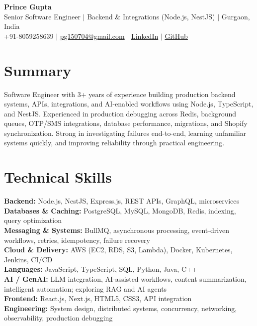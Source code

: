 \documentclass[letterpaper,10pt]{article}
\begin{document}
\begin{center}
{\Huge \textbf{Prince Gupta}}\\ \vspace{3pt}
\small Senior Software Engineer $|$ Backend \& Integrations (Node.js, NestJS) $|$ Gurgaon, India\\
\small +91-8059258639 $|$ \href{mailto:pg150704@gmail.com}{pg150704@gmail.com} $|$
\href{https://www.linkedin.com/in/princegupta-dev}{LinkedIn} $|$
\href{https://github.com/princegupta-dev}{GitHub}
\end{center}

\section{Summary}
\small{Software Engineer with 3+ years of experience building production backend systems, APIs, integrations, and AI-enabled workflows using Node.js, TypeScript, and NestJS. Experienced in production debugging across Redis, background queues, OTP/SMS integrations, database performance, migrations, and Shopify synchronization. Strong in investigating failures end-to-end, learning unfamiliar systems quickly, and improving reliability through practical engineering.}

\section{Technical Skills}
\begin{itemize}[leftmargin=.15in,label={}]
\small{\item{
\textbf{Backend:} Node.js, NestJS, Express.js, REST APIs, GraphQL, microservices\\
\textbf{Databases \& Caching:} PostgreSQL, MySQL, MongoDB, Redis, indexing, query optimization\\
\textbf{Messaging \& Systems:} BullMQ, asynchronous processing, event-driven workflows, retries, idempotency, failure recovery\\
\textbf{Cloud \& Delivery:} AWS (EC2, RDS, S3, Lambda), Docker, Kubernetes, Jenkins, CI/CD\\
\textbf{Languages:} JavaScript, TypeScript, SQL, Python, Java, C++\\
\textbf{AI / GenAI:} LLM integration, AI-assisted workflows, content summarization, intelligent automation; exploring RAG and AI agents\\
\textbf{Frontend:} React.js, Next.js, HTML5, CSS3, API integration\\
\textbf{Engineering:} System design, distributed systems, concurrency, networking, observability, production debugging
}}
\end{itemize}
\end{document}
